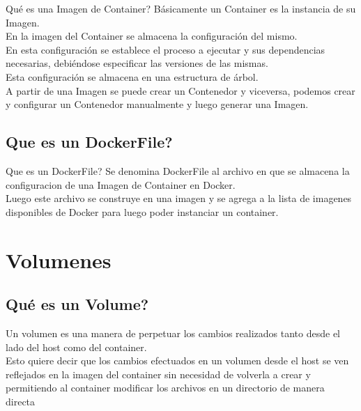 \documentclass{beamer}
\begin{document}
\begin{frame}{Qué es una Imagen de Container?}
 	Básicamente un Container es la instancia de su Imagen.\\
	En la imagen del Container se almacena la configuración del mismo.\\
	En esta configuración se establece el proceso a ejecutar y sus dependencias necesarias, debiéndose especificar las versiones de las mismas. \\
	Esta configuración se almacena en una estructura de árbol.\\
	A partir de una Imagen se puede crear un Contenedor y viceversa, podemos crear y configurar un Contenedor manualmente y luego generar una Imagen. \\
\end{frame}

\subsection{Que es un DockerFile?}
\begin{frame}{Que es un DockerFile?}
	Se denomina DockerFile al archivo en que se almacena la configuracion de una Imagen de Container en Docker. \\
	Luego este archivo se construye en una imagen y se agrega a la lista de imagenes disponibles de Docker para luego poder instanciar un container. \\
\end{frame}

\section{Volumenes}

\subsection{Qué es un Volume?}

\begin{frame}
	Un volumen es una manera de perpetuar los cambios realizados tanto desde el lado del host como del container.\\
	\vspace{.3cm}
	Esto quiere decir que los cambios efectuados en un volumen desde el host se ven reflejados en la imagen del container
	sin necesidad de volverla a crear y permitiendo al container modificar los archivos en un directorio de manera directa\\
\end{frame}
\end{document}
